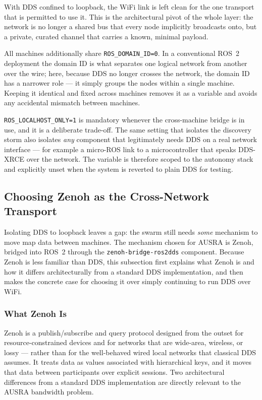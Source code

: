 With DDS confined to loopback, the WiFi link is left clean for the one transport that is permitted to use it. This is the architectural pivot of the whole layer: the network is no longer a shared bus that every node implicitly broadcasts onto, but a private, curated channel that carries a known, minimal payload.

All machines additionally share \texttt{ROS\_DOMAIN\_ID=0}. In a conventional ROS~2 deployment the domain ID is what separates one logical network from another over the wire; here, because DDS no longer crosses the network, the domain ID has a narrower role --- it simply groups the nodes within a single machine. Keeping it identical and fixed across machines removes it as a variable and avoids any accidental mismatch between machines.

\begin{notebox}
\texttt{ROS\_LOCALHOST\_ONLY=1} is mandatory whenever the cross-machine bridge is in use, and it is a deliberate trade-off. The same setting that isolates the discovery storm also isolates \emph{any} component that legitimately needs DDS on a real network interface --- for example a micro-ROS link to a microcontroller that speaks DDS-XRCE over the network. The variable is therefore scoped to the autonomy stack and explicitly unset when the system is reverted to plain DDS for testing.
\end{notebox}

\subsection{Choosing Zenoh as the Cross-Network Transport}
\label{subsec:zenoh}

Isolating DDS to loopback leaves a gap: the swarm still needs \emph{some} mechanism to move map data between machines. The mechanism chosen for AUSRA is Zenoh, bridged into ROS~2 through the \texttt{zenoh-bridge-ros2dds} component. Because Zenoh is less familiar than DDS, this subsection first explains what Zenoh is and how it differs architecturally from a standard DDS implementation, and then makes the concrete case for choosing it over simply continuing to run DDS over WiFi.

\subsubsection{What Zenoh Is}
\label{subsubsec:what_is_zenoh}

Zenoh is a publish/subscribe and query protocol designed from the outset for resource-constrained devices and for networks that are wide-area, wireless, or lossy --- rather than for the well-behaved wired local networks that classical DDS assumes. It treats data as values associated with hierarchical keys, and it moves that data between participants over explicit sessions. Two architectural differences from a standard DDS implementation are directly relevant to the AUSRA bandwidth problem.

